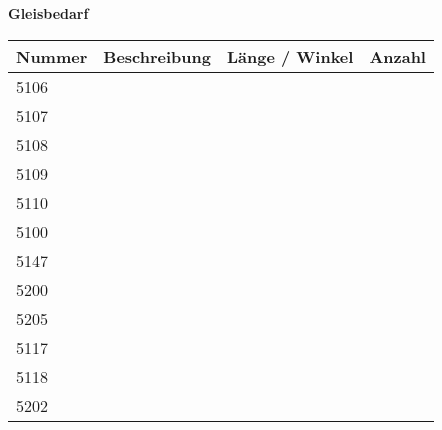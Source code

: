 \documentclass{article}
\begin{document}
\newpage
\textbf{Gleisbedarf}

\def\GleisAnzahlTab#1{ #1 & \@nameuse{D#1}       & \@nameuse{Dim#1} & \@nameuse{N#1}}
\begin{tabular}{llcr}
  Nummer & Beschreibung & Länge / Winkel & Anzahl \\
  \hline
  \GleisAnzahlTab{5106} \\
  \GleisAnzahlTab{5107} \\
  \GleisAnzahlTab{5108} \\
  \GleisAnzahlTab{5109} \\
  \GleisAnzahlTab{5110} \\
  \GleisAnzahlTab{5100} \\
  \GleisAnzahlTab{5147} \\
  \GleisAnzahlTab{5200} \\
  \GleisAnzahlTab{5205} \\
  \GleisAnzahlTab{5117} \\
  \GleisAnzahlTab{5118} \\
  \GleisAnzahlTab{5202} \\
  \hline
\end{tabular}
\end{document}
